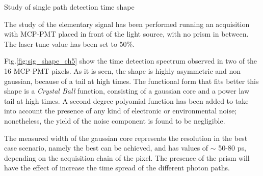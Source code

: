 \documentclass[a4paper,11pt]{article}
\begin{document}
\begin{subsection}{Study of single path detection time shape}

The study of the elementary signal has been performed running an acquisition with MCP-PMT placed in front of the light source, with no prism in between. The laser tune value has been set to 50\%.

Fig.\ref{fig:sig_shape_ch5} show the time detection spectrum observed in two of the 16 MCP-PMT pixels. As it is seen, the shape is highly asymmetric and non gaussian, because of a tail at high times. The functional form that fits better this shape is a {\it Crystal Ball} function, consisting of a gaussian core and a power law tail at high times. A second degree polyomial function has been added to take into account the presence of any kind of electronic or environmental noise; nonetheless, the yield of the noise component is found to be negligible. 

The measured width of the gaussian core represents the resolution in the best case scenario, namely the best can be achieved, and has values of $\sim$ 50-80 ps, depending on the acquisition chain of the pixel. The presence of the prism will have the effect of increase the time spread of the different photon paths.





\end{subsection}
\end{document}
